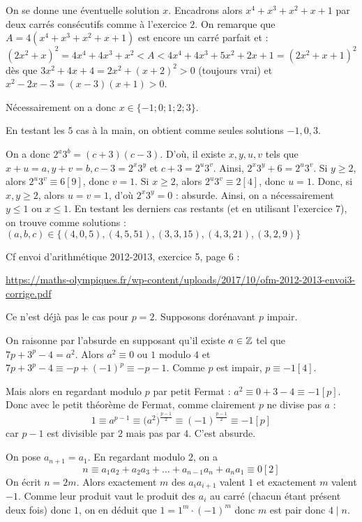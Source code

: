 \begin{sol}
On se donne une éventuelle solution $x$. Encadrons alors $x^4+x^3+x^2+x+1$ par deux carrés consécutifs comme à l'exercice $2$.
On remarque que $A=4(x^4+x^3+x^2+x+1)$ est encore un carré parfait et :
$$(2x^2+x)^2=4x^4+4x^3+x^2<A<4x^4+4x^3+5x^2+2x+1=(2x^2+x+1)^2$$
dès que $3x^2+4x+4=2x^2+(x+2)^2>0$ (toujours vrai) et $x^2-2x-3=(x-3)(x+1)>0$.

Nécessairement on a donc $x\in\{-1;0;1;2;3\}$.

En testant les $5$ cas à la main, on obtient comme seules solutions $-1,0,3$.
\end{sol}

\begin{sol} On a donc $2^a3^b=(c+3)(c-3)$.
D'où, il existe $x,y,u,v$ tels que $x+u=a, y+v=b, c-3=2^x3^y$ et $c+3=2^u3^v$. Ainsi, $2^x3^y+6=2^u3^v$.
Si $y\geq2$, alors $2^u3^v\equiv6[9]$, donc $v=1$.
Si $x\geq2$, alors $2^u3^v\equiv2[4]$, donc $u=1$.
Donc, si $x,y\geq2$, alors $u=v=1$, d'où $2^x3^y=0$ : absurde.
Ainsi, on a nécessairement $y\leq1$ ou $x\leq1$.
En testant les derniers cas restants (et en utilisant l'exercice $7$), on trouve comme solutions : $(a,b,c)\in \{(4,0,5),(4,5,51),(3,3,15),(4,3,21),(3,2,9)\}$
\end{sol}

\begin{sol}
Cf envoi d'arithmétique 2012-2013, exercice 5, page 6 :

\url{https://maths-olympiques.fr/wp-content/uploads/2017/10/ofm-2012-2013-envoi3-corrige.pdf}
\end{sol}


\begin{sol}
Ce n'est déjà pas le cas pour $p=2$. Supposons dorénavant $p$ impair.

On raisonne par l'absurde en supposant qu'il existe $a\in\mathbb Z$ tel que $7p+3^p-4=a^2$.
Alors $a^2\equiv0$ ou $1$ modulo $4$ et $7p+3^p-4\equiv-p+(-1)^p\equiv-p-1$.
Comme $p$ est impair, $p\equiv-1[4]$.

Mais alors en regardant modulo $p$ par petit Fermat : $a^2\equiv0+3-4\equiv-1[p]$.
Donc avec le petit théorème de Fermat, comme clairement $p$ ne divise pas $a$ : $$1\equiv a^{p-1}\equiv\big(a^2\big)^{\frac{p-1}2}\equiv(-1)^{\frac{p-1}2}\equiv-1[p]$$
car $p-1$ est divisible par $2$ mais pas par $4$. C'est absurde.
\end{sol}


\begin{sol}
On pose $a_{n+1}=a_1$.
En regardant modulo $2$, on a $$n\equiv a_1a_2+a_2a_3+\dots+a_{n-1}a_n+a_na_1\equiv 0[2]$$
On écrit $n=2m$. Alors exactement $m$ des $a_ia_{i+1}$ valent $1$ et exactement $m$ valent $-1$.
Comme leur produit vaut le produit des $a_i$ au carré (chacun étant présent deux fois) donc $1$, on en déduit que $1=1^m\cdot(-1)^m$ donc $m$ est pair donc $4\mid n$.
\end{sol}


